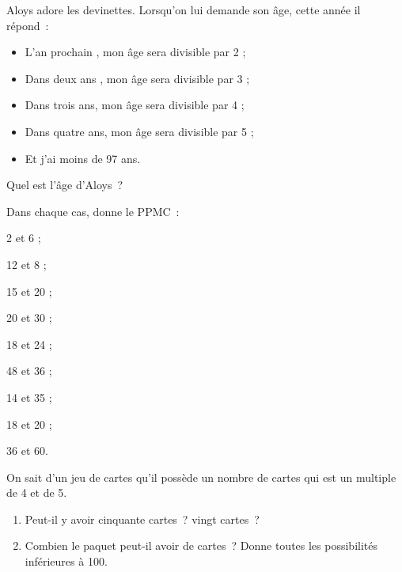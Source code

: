 \begin{exercice}
Aloys adore les devinettes. Lorsqu'on lui demande son âge, cette année il répond :
\begin{itemize}
 \item L'an prochain , mon âge sera divisible par 2 ;
 \item Dans deux ans , mon âge sera divisible par 3 ;
 \item Dans trois ans, mon âge sera divisible par 4 ;
 \item Dans quatre ans, mon âge sera divisible par 5 ;
 \item Et j'ai moins de 97 ans.
 \end{itemize}
Quel est l'âge d'Aloys ?
\end{exercice}




\begin{exercice}[PPMC]
Dans chaque cas, donne le PPMC :
\begin{colenumerate}{3}
 \item 2 et 6 ;
 \item 12 et 8 ;
 \item 15 et 20 ;
 \item 20 et 30 ;
 \item 18 et 24 ;
 \item 48 et 36 ;
 \item 14 et 35 ;
 \item 18 et 20 ;
 \item 36 et 60.
 \end{colenumerate}
\end{exercice}

\begin{exercice}
On sait d'un jeu de cartes qu’il possède un nombre de cartes qui est un multiple de 4 et de 5.
\begin{enumerate}
 \item Peut-il y avoir cinquante cartes ? vingt cartes ?
 \item Combien le paquet peut-il avoir de cartes ? Donne toutes les possibilités inférieures à 100.
 \end{enumerate}
\end{exercice}

